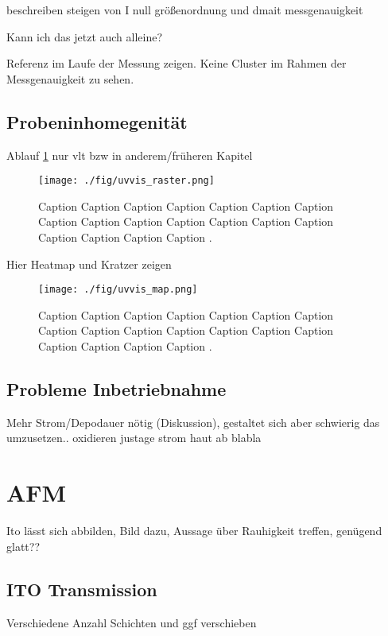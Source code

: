 beschreiben steigen von I null
größenordnung und dmait messgenauigkeit

Kann ich das jetzt auch alleine?





Referenz im Laufe der Messung zeigen.
Keine Cluster im Rahmen der Messgenauigkeit zu sehen.

\subsection{Probeninhomegenität}

Ablauf \ref{fig:uvvis_raster} nur vlt bzw in anderem/früheren Kapitel
\blindtext
\begin{figure}
    \centering
    \texttt{[image: ./fig/uvvis\_raster.png]}
    \caption{Caption Caption Caption Caption Caption Caption Caption Caption Caption Caption Caption Caption Caption Caption Caption Caption Caption Caption .}
    \label{fig:uvvis_raster}
\end{figure}

\blindtext
Hier Heatmap und Kratzer zeigen
\blindtext
\begin{figure}
    \centering
    \texttt{[image: ./fig/uvvis\_map.png]}
    \caption{Caption Caption Caption Caption Caption Caption Caption Caption Caption Caption Caption Caption Caption Caption Caption Caption Caption Caption .}
    \label{fig:uvvis_map}
\end{figure}
\blindtext
\subsection{Probleme Inbetriebnahme}
Mehr Strom/Depodauer nötig (Diskussion), gestaltet sich aber schwierig das umzusetzen.. oxidieren justage strom haut ab blabla
\section{AFM}
Ito lässt sich abbilden, Bild dazu, Aussage über Rauhigkeit treffen, genügend glatt?? \

\blindmathpaper

\subsection{ITO Transmission}

Verschiedene Anzahl Schichten und ggf verschieben
